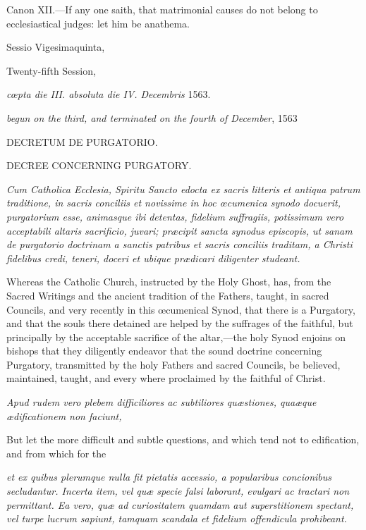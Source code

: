 Canon XII.—If any one saith, that matrimonial causes do not belong to ecclesiastical judges: let him be anathema.


Sessio Vigesimaquinta,

Twenty-fifth Session,

\emph{cœpta die III. absoluta die IV. Decembris} 1563.

\emph{begun on the third, and terminated on the fourth of December}, 1563

DECRETUM DE PURGATORIO.

DECREE CONCERNING PURGATORY.

\emph{Cum Catholica Ecclesia, Spiritu Sancto edocta ex sacris litteris et antiqua patrum traditione, in sacris conciliis et novissime in hoc œcumenica synodo docuerit, purgatorium esse, animasque ibi detentas, fidelium suffragiis, potissimum vero acceptabili altaris sacrificio, juvari; præcipit sancta synodus episcopis, ut sanam de purgatorio doctrinam a sanctis patribus et sacris conciliis traditam, a Christi fidelibus credi, teneri, doceri et ubique prædicari diligenter studeant.}

Whereas the Catholic Church, instructed by the Holy Ghost, has, from the Sacred Writings and the ancient tradition of the Fathers, taught, in sacred Councils, and very recently in this œcumenical Synod, that there is a Purgatory, and that the souls there detained are helped by the suffrages of the faithful, but principally by the acceptable sacrifice of the altar,—the holy Synod enjoins on bishops that they diligently endeavor that the sound doctrine concerning Purgatory, transmitted by the holy Fathers and sacred Councils, be believed, maintained, taught, and every where proclaimed by the faithful of Christ.

\emph{Apud rudem vero plebem difficiliores ac subtiliores quæstiones, quaæque ædificationem non faciunt, }

But let the more difficult and subtle questions, and which tend not to edification, and from which for the

\emph{et ex quibus plerumque nulla fit pietatis accessio, a popularibus concionibus secludantur. Incerta item, vel quæ specie falsi laborant, evulgari ac tractari non permittant. Ea vero, quæ ad curiositatem quamdam aut superstitionem spectant, vel turpe lucrum sapiunt, tamquam scandala et fidelium offendicula prohibeant.}

